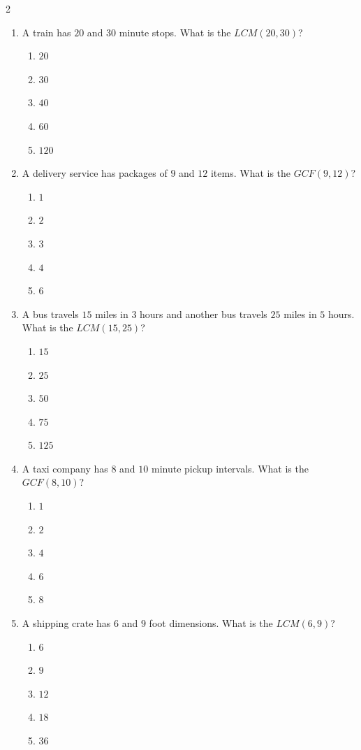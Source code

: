 \documentclass[10pt]{article}
\begin{document}
\begin{multicols}{2}
\begin{enumerate}[label=\textbf{Q\arabic*.}, leftmargin=*, itemsep=6pt, parsep=0pt]
  \item \small A train has $20$ and $30$ minute stops. What is the $LCM(20, 30)$?
  \begin{enumerate}[label=(\Alph*), leftmargin=0.6cm, nosep, itemsep=2pt]
    \item $20$
    \item $30$
    \item $40$
    \item $60$
    \item $120$
  \end{enumerate}

  \item \small A delivery service has packages of $9$ and $12$ items. What is the $GCF(9, 12)$?
  \begin{enumerate}[label=(\Alph*), leftmargin=0.6cm, nosep, itemsep=2pt]
    \item $1$
    \item $2$
    \item $3$
    \item $4$
    \item $6$
  \end{enumerate}

  \item \small A bus travels $15$ miles in $3$ hours and another bus travels $25$ miles in $5$ hours. What is the $LCM(15, 25)$?
  \begin{enumerate}[label=(\Alph*), leftmargin=0.6cm, nosep, itemsep=2pt]
    \item $15$
    \item $25$
    \item $50$
    \item $75$
    \item $125$
  \end{enumerate}

  \item \small A taxi company has $8$ and $10$ minute pickup intervals. What is the $GCF(8, 10)$?
  \begin{enumerate}[label=(\Alph*), leftmargin=0.6cm, nosep, itemsep=2pt]
    \item $1$
    \item $2$
    \item $4$
    \item $6$
    \item $8$
  \end{enumerate}

  \item \small A shipping crate has $6$ and $9$ foot dimensions. What is the $LCM(6, 9)$?
  \begin{enumerate}[label=(\Alph*), leftmargin=0.6cm, nosep, itemsep=2pt]
    \item $6$
    \item $9$
    \item $12$
    \item $18$
    \item $36$
  \end{enumerate}

\end{enumerate}
\end{multicols}
\end{document}
